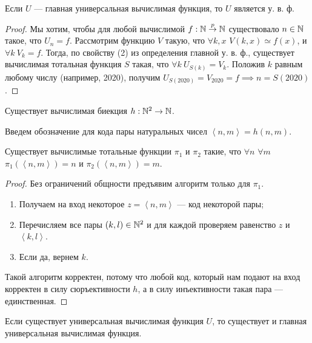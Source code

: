\begin{statement}
    Если $U$ --- главная универсальная вычислимая функция, то $U$ является у. в. ф.
\end{statement}
\begin{proof}
    Мы хотим, чтобы для любой вычислимой $f:\mathbb{N} \overset{p}{\to} \mathbb{N}$ существовало $n \in \mathbb{N}$ такое, что $U_{n} = f$.
    Рассмотрим функцию $V$ такую, что $\forall k, x$ $V\left(k, x\right) \simeq f\left(x\right)$, и $\forall k~V_{k} = f$.
    Тогда, по свойству (2) из определения главной у. в. ф., существует вычислимая тотальная функция $S$ такая, что $\forall k~U_{S(k)} = V_{k}$.
    Положив $k$ равным любому числу (например, 2020), получим $U_{S\left(2020\right)} = V_{2020} = f \implies n = S(2020)$.
\end{proof}
\begin{statement}
    Существует вычислимая биекция $h:\mathbb{N}^{2} \to \mathbb{N}$.
\end{statement}
    Введем обозначение для кода пары натуральных чисел $\left\langle n, m\right\rangle = h\left(n, m\right)$.
\begin{statement}
    Существует вычислимые тотальные функции $\pi_{1}$ и $\pi_{2}$ такие, что $\forall n$ $\forall m$ $\pi_{1}\left(\left\langle n, m\right\rangle\right) = n$ и $\pi_{2}\left(\left\langle n, m\right\rangle\right) = m$.
\end{statement}
\begin{proof}
    Без ограничений общности предъявим алгоритм только для $\pi_{1}$.
    \begin{enumerate}
        \item Получаем на вход некоторое $z = \left\langle n, m\right\rangle$ --- код некоторой пары;
        \item Перечисляем все пары $\left(k, l\right) \in \mathbb{N}^{2}$ и для каждой проверяем равенство $z$ и $\left\langle k, l\right\rangle$.
        \item Если да, вернем $k$.
    \end{enumerate}
    Такой алгоритм корректен, потому что любой код, который нам подают на вход корректен в силу сюръективности $h$, а в силу инъективности такая пара --- единственная.
\end{proof}
\begin{theorem}
    Если существует универсальная вычислимая функция $U$, то существует и главная универсальная вычислимая функция.
\end{theorem}
